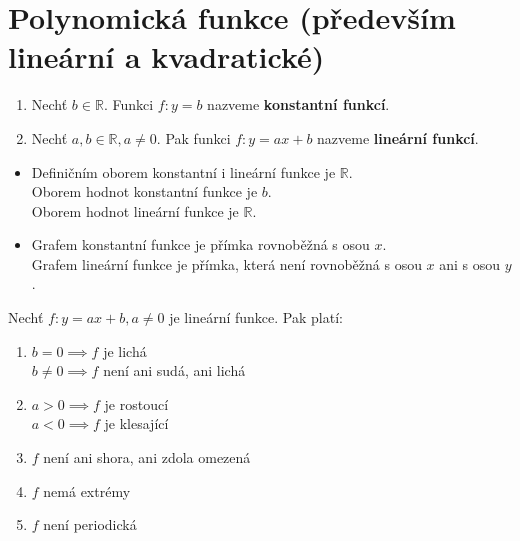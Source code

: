 \section{Polynomická funkce (především lineární a kvadratické)}

\begin{definition}
\begin{enumerate}
  \item Nechť $b \in \mathbb R$. Funkci $f:y = b$ nazveme \textbf{konstantní funkcí}.
  \item Nechť $a, b \in \mathbb R, a \neq 0$. Pak funkci $f:y= ax + b$ nazveme \textbf{lineární funkcí}. 
\end{enumerate}
\end{definition}

\begin{pozn}
  \begin{itemize}
    \item Definičním oborem konstantní i lineární funkce je $\mathbb R$. \\
          Oborem hodnot konstantní funkce je ${b}$.\\
          Oborem hodnot lineární funkce je $\mathbb R$. 
    \item Grafem konstantní funkce je přímka rovnoběžná s osou $x$. \\
          Grafem lineární funkce je přímka, která není rovnoběžná s osou $x$ ani s osou $y$.
  \end{itemize}
\end{pozn}

\begin{veta}
  Nechť $f: y = ax + b, a \neq 0$ je lineární funkce. Pak platí: 
  \begin{enumerate}[1.]
    \item $b=0 \implies f$ je lichá\\
          $b \neq 0 \implies f$ není ani sudá, ani lichá
    \item $a > 0 \implies f$ je rostoucí\\ 
          $a < 0 \implies f$ je klesající
    \item $f$ není ani shora, ani zdola omezená
    \item $f$ nemá extrémy 
    \item $f$ není periodická
  \end{enumerate}
\end{veta}


